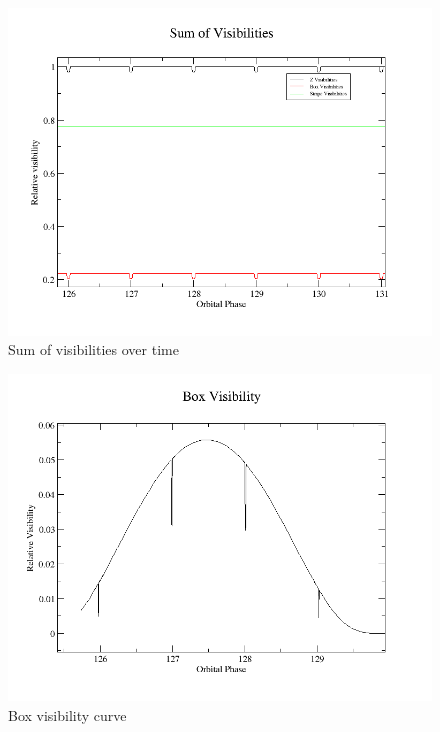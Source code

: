 \begin{figure}[h]
	\centering
	\includegraphics[width=.5\textwidth]{images/sum_vis.png}
	\caption{Sum of visibilities over time}
	\label{sum_vis}
\end{figure}

\begin{figure}[h]
	\centering
	\includegraphics[width=.5\textwidth]{images/box_vis.png}
	\caption{Box visibility curve}
	\label{box_vis}
\end{figure}